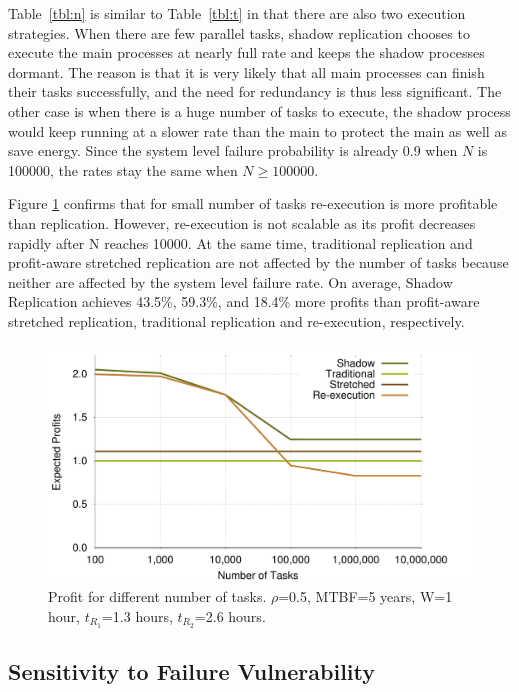 Table~\ref{tbl:n} is similar to Table~\ref{tbl:t} in that there are also two execution strategies. When there are few parallel tasks, shadow
replication chooses to execute the main processes at nearly full rate and keeps
the shadow processes dormant. The
reason is that it is very likely that all main processes can finish
their tasks successfully, and the need for redundancy is thus less
significant. The other case is when there is a huge number of
tasks to execute, the shadow process would keep running at a slower rate than the main to protect the main as well as save energy. Since the system level failure probability is already 0.9 when $N$ is 100000, the rates stay the same when $N \ge 100000$.

Figure \ref{fig:n} confirms that for small number of tasks
re-execution is more profitable than replication. However, re-execution is not scalable
as its profit decreases rapidly after N reaches 10000. At the same time, traditional
replication and profit-aware stretched replication are not
affected by the number of tasks because neither are affected by the
system level failure rate. On average, Shadow Replication achieves 43.5\%, 59.3\%, and 18.4\%
more profits than profit-aware stretched replication, traditional replication and re-execution, respectively. 

\begin{figure}[!h]	
	\begin{center}
			\includegraphics[width=\columnwidth]{Figures/n_profit}
	\end{center}
	\caption{Profit for different number of tasks. $\rho$=0.5, MTBF=5 years, W=1 hour, $t_{R_1}$=1.3 hours, $t_{R_2}$=2.6 hours.}
	\label{fig:n}
\end{figure}

\subsection{Sensitivity to Failure Vulnerability}

